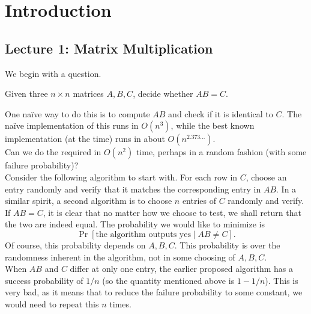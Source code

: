 \section{Introduction}

	\subsection{Lecture 1: Matrix Multiplication}

		We begin with a question.

		\begin{problem*}
			Given three $n\times n$ matrices $A,B,C$, decide whether $AB = C$. 
		\end{problem*}

		One na\"{i}ve way to do this is to compute $AB$ and check if it is identical to $C$. The na\"{i}ve implementation of this runs in $O(n^3)$, while the best known implementation (at the time) runs in about $O(n^{2.373\ldots})$. \\
		Can we do the required in $O(n^2)$ time, perhaps in a random fashion (with some failure probability)?\\

		Consider the following algorithm to start with. For each row in $C$, choose an entry randomly and verify that it matches the corresponding entry in $AB$. In a similar spirit, a second algorithm is to choose $n$ entries of $C$ randomly and verify.\\

		If $AB = C$, it is clear that no matter how we choose to test, we shall return that the two are indeed equal. The probability we would like to minimize is
		\[ \Pr[\text{the algorithm outputs yes} \mid AB \ne C]. \]
		Of course, this probability depends on $A,B,C$. This probability is over the randomness inherent in the algorithm, not in some choosing of $A,B,C$. \\

		When $AB$ and $C$ differ at only one entry, the earlier proposed algorithm has a success probability of $1/n$ (so the quantity mentioned above is $1-1/n$). This is very bad, as it means that to reduce the failure probability to some constant, we would need to repeat this $n$ times.\\

